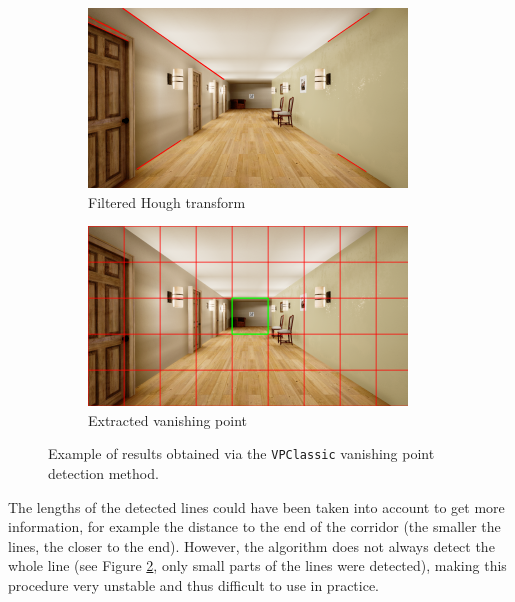 \begin{figure}[H]
\begin{subfigure}{0.49\textwidth}
        \includegraphics[width=\textwidth]{resources/png/06/vanishing-point/vpclassic/2.png}
        \caption{Filtered Hough transform}
    \end{subfigure}
    \hfill
    \begin{subfigure}{0.49\textwidth}
        \centering
        \includegraphics[width=\textwidth]{resources/png/06/vanishing-point/vpclassic/3.png}
        \caption{Extracted vanishing point}
        \label{fig:06.vpclassic.example.cell}
    \end{subfigure}
    \caption{Example of results obtained via the \texttt{VPClassic} vanishing point detection method.}
    \label{fig:06.vpclassic.example}
\end{figure}

\begin{note}
    The lengths of the detected lines could have been taken into account to get more information, for example the distance to the end of the corridor (the smaller the lines, the closer to the end). However, the algorithm does not always detect the whole line (see Figure \ref{fig:06.vpclassic.example}, only small parts of the lines were detected), making this procedure very unstable and thus difficult to use in practice.
\end{note}

